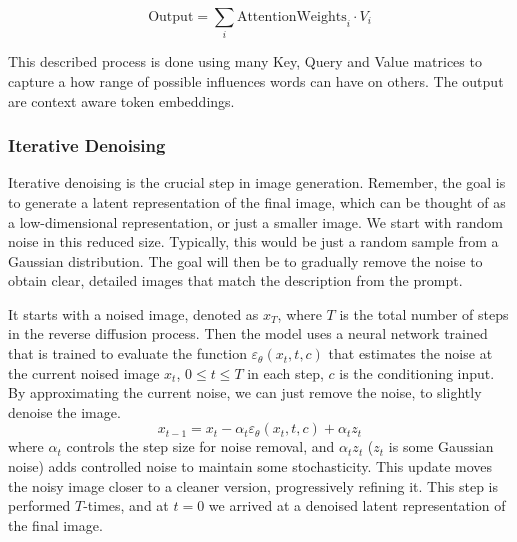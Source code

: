 \documentclass[11pt]{article}
\begin{document}
    $$\mathrm{Output} = \sum_i \mathrm{Attention Weights}_i \cdot V_i$$

    This described process is done using many Key, Query and Value matrices to capture a how range of possible influences words can have on others. The output are context aware token embeddings.
\fi

\subsubsection{Iterative Denoising}
Iterative denoising is the crucial step in image generation. Remember, the goal is to generate a latent representation of the final image, which can be thought of as a low-dimensional representation, or just a smaller image. We start with random noise in this reduced size. Typically, this would be just a random sample from a Gaussian distribution. The goal will then be to gradually remove the noise to obtain clear, detailed images that match the description from the prompt.

It starts with a noised image, denoted as $x_T$, where $T$ is the total number of steps in the reverse diffusion process. Then the model uses a neural network trained that is trained to evaluate the function $\varepsilon_\theta(x_t,t,c)$ that estimates the noise at the current noised image $x_t$, $0 \leq t \leq T$ in each step, $c$ is the conditioning input. By approximating the current noise, we can just remove the noise, to slightly denoise the image.
$$x_{t-1}=x_t-\alpha_t \varepsilon_\theta(x_t,t,c)+ \alpha_t z_t$$
where $\alpha_t$ controls the step size for noise removal, and $\alpha_t z_t$  ($z_t$ is some Gaussian noise) adds controlled noise to maintain some stochasticity. This update moves the noisy image closer to a cleaner version, progressively refining it. This step is performed $T$-times, and at $t=0$ we arrived at a denoised latent representation of the final image.
\end{document}
